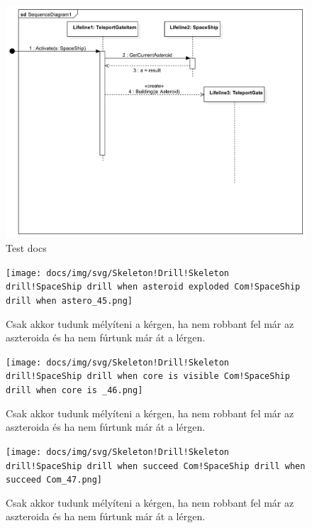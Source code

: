 \begin{figure}[H] 
\centering 
\includegraphics[width=1\textwidth]{docs/img/svg/Skeleton!Place gate!Interaction1!SequenceDiagram1_34.png} 
\caption{Test docs
} 
\end{figure} 

\begin{figure}[H] 
\centering 
\texttt{[image: docs/img/svg/Skeleton!Drill!Skeleton drill!SpaceShip drill when asteroid exploded Com!SpaceShip drill when astero\_45.png]} 
\caption{Csak akkor tudunk mélyíteni a kérgen, ha nem robbant fel már az aszteroida és ha nem fúrtunk már át a lérgen.} 
\end{figure} 

\begin{figure}[H] 
\centering 
\texttt{[image: docs/img/svg/Skeleton!Drill!Skeleton drill!SpaceShip drill when core is visible Com!SpaceShip drill when core is \_46.png]} 
\caption{Csak akkor tudunk mélyíteni a kérgen, ha nem robbant fel már az aszteroida és ha nem fúrtunk már át a lérgen.} 
\end{figure} 

\begin{figure}[H] 
\centering 
\texttt{[image: docs/img/svg/Skeleton!Drill!Skeleton drill!SpaceShip drill when succeed Com!SpaceShip drill when succeed Com\_47.png]} 
\caption{Csak akkor tudunk mélyíteni a kérgen, ha nem robbant fel már az aszteroida és ha nem fúrtunk már át a lérgen.} 
\end{figure} 

